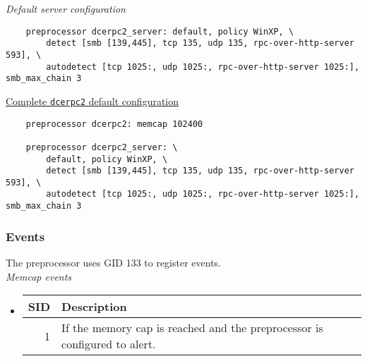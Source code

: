 \documentclass[english]{report}
\begin{document}
\textit{Default server configuration}
\footnotesize
\begin{verbatim}
    preprocessor dcerpc2_server: default, policy WinXP, \
        detect [smb [139,445], tcp 135, udp 135, rpc-over-http-server 593], \
        autodetect [tcp 1025:, udp 1025:, rpc-over-http-server 1025:], smb_max_chain 3
\end{verbatim}
\normalsize

\underline{Complete \texttt{dcerpc2} default configuration}
\footnotesize
\begin{verbatim}
    preprocessor dcerpc2: memcap 102400

    preprocessor dcerpc2_server: \
        default, policy WinXP, \
        detect [smb [139,445], tcp 135, udp 135, rpc-over-http-server 593], \
        autodetect [tcp 1025:, udp 1025:, rpc-over-http-server 1025:], smb_max_chain 3
\end{verbatim}
\normalsize

\subsubsection{Events}
The preprocessor uses GID 133 to register events.\\

\textit{Memcap events}
\begin{itemize}
\item[]

\begin{longtable}{|r|p{13.5cm}|}

\hline
SID & Description\\
\hline

\hline
  1 &

If the memory cap is reached and the preprocessor is configured to alert.\\

\hline
\end{longtable}
\end{itemize}
\end{document}
